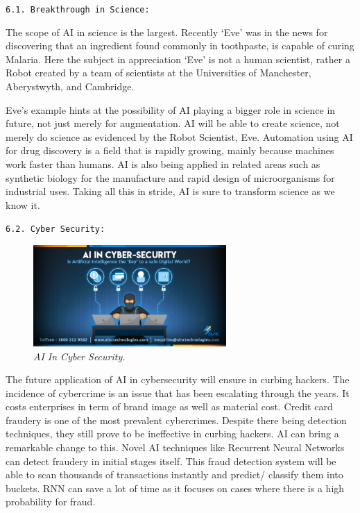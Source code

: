 \documentclass{article}
\begin{document}
 \begin{large}
 \texttt{6.1. Breakthrough in Science:}
 \end{large}
 The scope of AI in science is the largest. Recently ‘Eve’ was in the news for discovering that an ingredient found commonly in toothpaste, is capable of curing Malaria. Here the subject in appreciation ‘Eve’ is not a human scientist, rather a Robot created by a team of scientists at the Universities of Manchester, Aberystwyth, and Cambridge.

Eve’s example hints at the possibility of AI playing a bigger role in science in future, not just merely for augmentation. AI will be able to create science, not merely do science as evidenced by the Robot Scientist, Eve. Automation using AI for drug discovery is a field that is rapidly growing, mainly because machines work faster than humans. AI is also being applied in related areas such as synthetic biology for the manufacture and rapid design of microorganisms for industrial uses. Taking all this in stride, AI is sure to transform science as we know it.\\

\begin{large}
\texttt{6.2. Cyber Security:}
\end{large}

\begin{figure}
\centering
\includegraphics[width=2.9in]{AI In Cyber}

\caption{\textit{AI In Cyber Security.}}
\end{figure}

The future application of AI in cybersecurity will ensure in curbing hackers. The incidence of cybercrime is an issue that has been escalating through the years. It costs enterprises in term of brand image as well as material cost. Credit card fraudery is one of the most prevalent cybercrimes. Despite there being detection techniques, they still prove to be ineffective in curbing hackers. AI can bring a remarkable change to this. Novel AI techniques like Recurrent Neural Networks can detect fraudery in initial stages itself. This fraud detection system will be able to scan thousands of transactions instantly and predict/ classify them into buckets. RNN can save a lot of time as it focuses on cases where there is a high probability for fraud.\\\\
\end{document}

